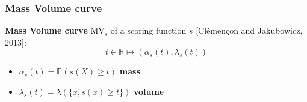 \documentclass{beamer}
\begin{document}
\begin{frame}\frametitle{Mass Volume curve}

\textbf{Mass Volume curve} $\text{MV}_s$ of a scoring function $s$ {\color{bleu}[Clémençon and Jakubowicz, 2013]}:
\begin{equation*}
t \in \mathbb{R} \mapsto (\alpha_s(t), \lambda_s(t))
\end{equation*}
\begin{itemize}
\item $\alpha_s(t) = \mathbb{P}(s(X) \geq t)$ \textbf{mass}
\vspace{0.2cm}
\item $\lambda_s(t) = \lambda(\{x, s(x) \geq t\})$ \textbf{volume}
\end{itemize}

\begin{figure}[htb]
\centering
{}
\end{figure}


\end{frame}
\end{document}
